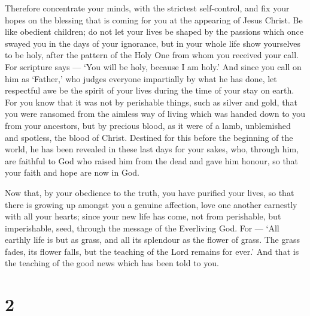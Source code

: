  Therefore concentrate your minds, with the strictest
self-control, and fix your hopes on the blessing that is coming for you
at the appearing of Jesus Christ.  Be like obedient
children; do not let your lives be shaped by the passions which once
swayed you in the days of your ignorance,  but in your
whole life show yourselves to be holy, after the pattern of the Holy One
from whom you received your call.  For scripture says ---
`You will be holy, because I am holy.'  And since you call
on him as `Father,' who judges everyone impartially by what he has done,
let respectful awe be the spirit of your lives during the time of your
stay on earth.  For you know that it was not by perishable
things, such as silver and gold, that you were ransomed from the aimless
way of living which was handed down to you from your ancestors,
 but by precious blood, as it were of a lamb, unblemished
and spotless, the blood of Christ.  Destined for this
before the beginning of the world, he has been revealed in these last
days for your sakes,  who, through him, are faithful to God
who raised him from the dead and gave him honour, so that your faith and
hope are now in God.

 Now that, by your obedience to the truth, you have
purified your lives, so that there is growing up amongst you a genuine
affection, love one another earnestly with all your hearts;
 since your new life has come, not from perishable, but
imperishable, seed, through the message of the Everliving God.
 For --- `All earthly life is but as grass, and all its
splendour as the flower of grass. The grass fades, its flower falls,
 but the teaching of the Lord remains for ever.' And that
is the teaching of the good news which has been told to you.

\hypertarget{section-1}{%
\section{2}\label{section-1}}

